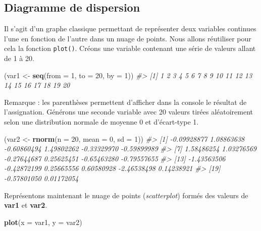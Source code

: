 \documentclass[]{article}
\newenvironment{Shaded}{\begin{snugshade}}{\end{snugshade}}
\newcommand{\CommentTok}[1]{\textcolor[rgb]{0.56,0.35,0.01}{\textit{#1}}}
\newcommand{\DataTypeTok}[1]{\textcolor[rgb]{0.13,0.29,0.53}{#1}}
\newcommand{\DecValTok}[1]{\textcolor[rgb]{0.00,0.00,0.81}{#1}}
\newcommand{\KeywordTok}[1]{\textcolor[rgb]{0.13,0.29,0.53}{\textbf{#1}}}
\newcommand{\NormalTok}[1]{#1}
\newcommand{\StringTok}[1]{\textcolor[rgb]{0.31,0.60,0.02}{#1}}
\begin{document}
\hypertarget{diagramme-de-dispersion}{%
\subsection{Diagramme de dispersion}\label{diagramme-de-dispersion}}

Il s'agit d'un graphe classique permettant de représenter deux variables continues l'une en fonction de l'autre dans un nuage de points. Nous allons réutiliser pour cela la fonction \texttt{plot()}.
Créons une variable contenant une série de valeurs allant de 1 à 20.

\begin{Shaded}
\begin{Highlighting}[]
\NormalTok{(var1 <-}\StringTok{ }\KeywordTok{seq}\NormalTok{(}\DataTypeTok{from =} \DecValTok{1}\NormalTok{, }\DataTypeTok{to =} \DecValTok{20}\NormalTok{, }\DataTypeTok{by =} \DecValTok{1}\NormalTok{))}
\CommentTok{#>  [1]  1  2  3  4  5  6  7  8  9 10 11 12 13 14 15 16 17 18 19 20}
\end{Highlighting}
\end{Shaded}

Remarque : les parenthèses permettent d'afficher dans la console le résultat de l'assignation. Générons une seconde variable avec 20 valeurs tirées aléatoirement selon une distribution normale de moyenne 0 et d'écart-type 1.

\begin{Shaded}
\begin{Highlighting}[]
\NormalTok{(var2 <-}\StringTok{ }\KeywordTok{rnorm}\NormalTok{(}\DataTypeTok{n =} \DecValTok{20}\NormalTok{, }\DataTypeTok{mean =} \DecValTok{0}\NormalTok{, }\DataTypeTok{sd =} \DecValTok{1}\NormalTok{))}
\CommentTok{#>  [1] -0.09928877  1.08863638 -0.60860494  1.49802262 -0.33329970 -0.59899989}
\CommentTok{#>  [7]  1.58486254  1.03276569 -0.27644687  0.25625451 -0.65463280 -0.79557655}
\CommentTok{#> [13] -1.43563506 -0.42872199  0.25665556  0.60580928 -2.46538498  0.14238921}
\CommentTok{#> [19] -0.57801050  0.01172054}
\end{Highlighting}
\end{Shaded}

Représentons maintenant le nuage de points (\emph{scatterplot}) formés des valeurs de \textbf{var1} et \textbf{var2}.

\begin{Shaded}
\begin{Highlighting}[]
\KeywordTok{plot}\NormalTok{(}\DataTypeTok{x =}\NormalTok{ var1, }\DataTypeTok{y =}\NormalTok{ var2)}
\end{Highlighting}
\end{Shaded}
\end{document}

